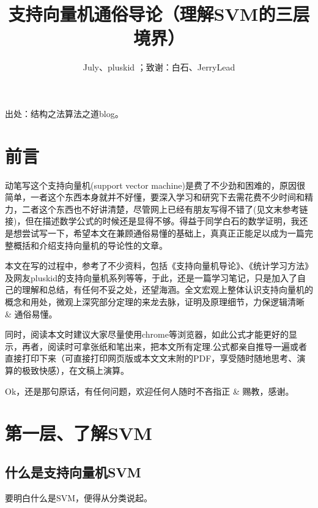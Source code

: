 \documentclass[a4paper,12pt]{article}
\begin{document}

\cnarticle			%
\yemeiclean  %

  \title{支持向量机通俗导论（理解SVM的三层境界）}
  \author{July、pluskid ；致谢：白石、JerryLead}
  \date{}
\maketitle
出处：结构之法算法之道blog。

\section*{前言}
动笔写这个支持向量机(support vector machine)是费了不少劲和困难的，原因很简单，一者这个东西本身就并不好懂，要深入学习和研究下去需花费不少时间和精力，二者这个东西也不好讲清楚，尽管网上已经有朋友写得不错了(见文末参考链接)，但在描述数学公式的时候还是显得不够。得益于同学白石的数学证明，我还是想尝试写一下，希望本文在兼顾通俗易懂的基础上，真真正正能足以成为一篇完整概括和介绍支持向量机的导论性的文章。

本文在写的过程中，参考了不少资料，包括《支持向量机导论》、《统计学习方法》及网友pluskid的支持向量机系列等等，于此，还是一篇学习笔记，只是加入了自己的理解和总结，有任何不妥之处，还望海涵。全文宏观上整体认识支持向量机的概念和用处，微观上深究部分定理的来龙去脉，证明及原理细节，力保逻辑清晰 \& 通俗易懂。

同时，阅读本文时建议大家尽量使用chrome等浏览器，如此公式才能更好的显示，再者，阅读时可拿张纸和笔出来，把本文所有定理.公式都亲自推导一遍或者直接打印下来（可直接打印网页版或本文文末附的PDF，享受随时随地思考、演算的极致快感），在文稿上演算。

Ok，还是那句原话，有任何问题，欢迎任何人随时不吝指正 \& 赐教，感谢。

\section{第一层、了解SVM}
\subsection{什么是支持向量机SVM}
要明白什么是SVM，便得从分类说起。
\end{document}
